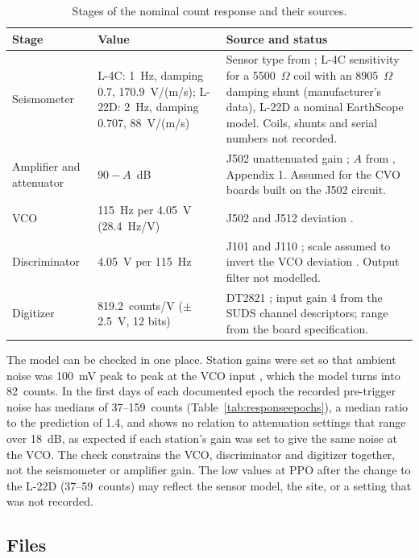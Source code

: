\documentclass[11pt]{article}
\begin{document}
\begin{table}[htbp]
\centering\scriptsize
\caption{Stages of the nominal count response and their sources.}\label{tab:stages}
\begin{tabular}{>{\raggedright}p{2.2cm}>{\raggedright}p{3.6cm}>{\raggedright\arraybackslash}p{9.6cm}}
\toprule
Stage & Value & Source and status\\
\midrule
Seismometer & L-4C: 1~Hz, damping 0.7, 170.9~V/(m/s); L-22D: 2~Hz, damping 0.707, 88~V/(m/s) & Sensor type from \citet{Lockhart_1996}; L-4C sensitivity for a 5500~$\Omega$ coil with an 8905~$\Omega$ damping shunt (manufacturer's data), L-22D a nominal EarthScope model. Coils, shunts and serial numbers not recorded.\\
Amplifier and attenuator & $90-A$~dB & J502 unattenuated gain \citep{McChesney_1999}; $A$ from \citet{Lockhart_1996}, Appendix 1. Assumed for the CVO boards built on the J502 circuit.\\
VCO & 115~Hz per 4.05~V (28.4~Hz/V) & J502 and J512 deviation \citep{McChesney_1999}.\\
Discriminator & 4.05~V per 115~Hz & J101 and J110 \citep{Lockhart_1996}; scale assumed to invert the VCO deviation \citep{McChesney_1999}. Output filter not modelled.\\
Digitizer & 819.2~counts/V ($\pm$2.5~V, 12 bits) & DT2821 \citep{Murray_1996}; input gain 4 from the SUDS channel descriptors; range from the board specification.\\
\bottomrule
\end{tabular}
\end{table}

The model can be checked in one place. Station gains were set so that ambient noise was 100~mV peak to peak at the VCO input \citep{Lockhart_1996}, which the model turns into 82~counts. In the first days of each documented epoch the recorded pre-trigger noise has medians of 37--159~counts (Table~\ref{tab:responseepochs}), a median ratio to the prediction of 1.4, and shows no relation to attenuation settings that range over 18~dB, as expected if each station's gain was set to give the same noise at the VCO. The check constrains the VCO, discriminator and digitizer together, not the seismometer or amplifier gain. The low values at PPO after the change to the L-22D (37--59~counts) may reflect the sensor model, the site, or a setting that was not recorded.

\subsection{Files}
\end{document}
